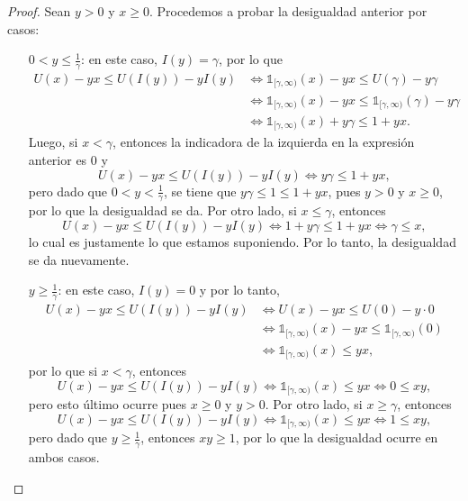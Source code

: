 \documentclass[letterpaper]{article}
\newcommand{\1}{\mathds{1}}
\theoremstyle{definition}
\theoremstyle{definition}
\theoremstyle{definition}
\theoremstyle{definition}
\theoremstyle{definition}
\begin{document}
\begin{enumerate}
\begin{enumerate}
\begin{proof}
      Sean $y>0$ y $x\geq0$. Procedemos a probar la desigualdad anterior por casos:
      \begin{itemize}
        \item[$0< y \leq \frac{1}{\gamma}$:] en este caso, $I(y)=\gamma$, por lo que 
        \begin{align*}
            U(x)-yx\leq U(I(y))-yI(y)&\Longleftrightarrow\1_{[\gamma,\infty)}(x)-yx\leq U(\gamma)-y\gamma\\
            &\Longleftrightarrow \1_{[\gamma,\infty)}(x)-yx\leq \1_{[\gamma,\infty)}(\gamma)-y\gamma\\
            &\Longleftrightarrow \1_{[\gamma,\infty)}(x)+y\gamma\leq 1+yx.
        \end{align*}
        Luego, si $x<\gamma$, entonces la indicadora de la izquierda en la expresión anterior es 0 y 
        \[
            U(x)-yx\leq U(I(y))-yI(y) \Longleftrightarrow y\gamma\leq 1+yx,
        \]
        pero dado que $0<y<\frac{1}{\gamma}$, se tiene que $y\gamma\leq 1\leq 1+yx$, pues $y>0$ y $x\geq0$, por lo que
        la desigualdad se da. Por otro lado, si $x\leq\gamma$, entonces 
        \[
            U(x)-yx\leq U(I(y))-yI(y) \Longleftrightarrow 1+ y\gamma\leq 1+yx \Longleftrightarrow \gamma\leq x,
        \]
        lo cual es justamente lo que estamos suponiendo. Por lo tanto, la desigualdad se da nuevamente. 
        \item[$y\geq\frac{1}{\gamma}$:] en este caso, $I(y)=0$ y por lo tanto, 
        \begin{align*}
            U(x)-yx\leq U(I(y))-yI(y)&\Longleftrightarrow U(x)-yx\leq U(0)-y\cdot0\\
            &\Longleftrightarrow \1_{[\gamma,\infty)}(x)-yx\leq \1_{[\gamma,\infty)}(0)\\
            &\Longleftrightarrow \1_{[\gamma,\infty)}(x)\leq yx,
        \end{align*}
        por lo que si $x<\gamma$, entonces 
        \[
            U(x)-yx\leq U(I(y))-yI(y)\Longleftrightarrow \1_{[\gamma,\infty)}(x)\leq yx \Longleftrightarrow 0\leq xy,
        \] 
        pero esto último ocurre pues $x\geq0$ y $y>0$. Por otro lado, si $x\geq\gamma$, entonces
        \[
            U(x)-yx\leq U(I(y))-yI(y)\Longleftrightarrow \1_{[\gamma,\infty)}(x)\leq yx \Longleftrightarrow1\leq xy,
        \]
        pero dado que $y\geq \frac{1}{\gamma}$, entonces $xy\geq 1$, por lo que la desigualdad ocurre en ambos casos.
      \end{itemize}
     \end{proof}

\end{enumerate}
\end{enumerate}
\end{document}
